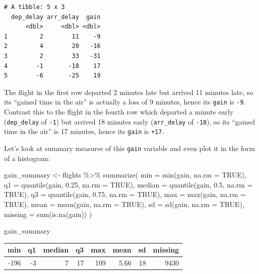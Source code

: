 \documentclass[
  letterpaper,
  DIV=11,
  numbers=noendperiod]{scrreprt}
\newenvironment{Shaded}{\begin{snugshade}}{\end{snugshade}}
\newcommand{\AttributeTok}[1]{\textcolor[rgb]{0.40,0.45,0.13}{#1}}
\newcommand{\ConstantTok}[1]{\textcolor[rgb]{0.56,0.35,0.01}{#1}}
\newcommand{\FloatTok}[1]{\textcolor[rgb]{0.68,0.00,0.00}{#1}}
\newcommand{\FunctionTok}[1]{\textcolor[rgb]{0.28,0.35,0.67}{#1}}
\newcommand{\NormalTok}[1]{\textcolor[rgb]{0.00,0.23,0.31}{#1}}
\newcommand{\OtherTok}[1]{\textcolor[rgb]{0.00,0.23,0.31}{#1}}
\newcommand{\SpecialCharTok}[1]{\textcolor[rgb]{0.37,0.37,0.37}{#1}}
\theoremstyle{definition}
\theoremstyle{remark}
\begin{document}
\begin{verbatim}
# A tibble: 5 x 3
  dep_delay arr_delay  gain
      <dbl>     <dbl> <dbl>
1         2        11    -9
2         4        20   -16
3         2        33   -31
4        -1       -18    17
5        -6       -25    19
\end{verbatim}

The flight in the first row departed 2 minutes late but arrived 11
minutes late, so its ``gained time in the air'' is actually a loss of 9
minutes, hence its \texttt{gain} is \texttt{-9}. Contrast this to the
flight in the fourth row which departed a minute early
(\texttt{dep\_delay} of \texttt{-1}) but arrived 18 minutes early
(\texttt{arr\_delay} of \texttt{-18}), so its ``gained time in the air''
is 17 minutes, hence its \texttt{gain} is \texttt{+17}.

Let's look at summary measures of this \texttt{gain} variable and even
plot it in the form of a histogram:

\begin{Shaded}
\begin{Highlighting}[]
\NormalTok{gain\_summary }\OtherTok{\textless{}{-}}\NormalTok{ flights }\SpecialCharTok{\%\textgreater{}\%} 
  \FunctionTok{summarize}\NormalTok{(}
    \AttributeTok{min =} \FunctionTok{min}\NormalTok{(gain, }\AttributeTok{na.rm =} \ConstantTok{TRUE}\NormalTok{),}
    \AttributeTok{q1 =} \FunctionTok{quantile}\NormalTok{(gain, }\FloatTok{0.25}\NormalTok{, }\AttributeTok{na.rm =} \ConstantTok{TRUE}\NormalTok{),}
    \AttributeTok{median =} \FunctionTok{quantile}\NormalTok{(gain, }\FloatTok{0.5}\NormalTok{, }\AttributeTok{na.rm =} \ConstantTok{TRUE}\NormalTok{),}
    \AttributeTok{q3 =} \FunctionTok{quantile}\NormalTok{(gain, }\FloatTok{0.75}\NormalTok{, }\AttributeTok{na.rm =} \ConstantTok{TRUE}\NormalTok{),}
    \AttributeTok{max =} \FunctionTok{max}\NormalTok{(gain, }\AttributeTok{na.rm =} \ConstantTok{TRUE}\NormalTok{),}
    \AttributeTok{mean =} \FunctionTok{mean}\NormalTok{(gain, }\AttributeTok{na.rm =} \ConstantTok{TRUE}\NormalTok{),}
    \AttributeTok{sd =} \FunctionTok{sd}\NormalTok{(gain, }\AttributeTok{na.rm =} \ConstantTok{TRUE}\NormalTok{),}
    \AttributeTok{missing =} \FunctionTok{sum}\NormalTok{(}\FunctionTok{is.na}\NormalTok{(gain))}
\NormalTok{  )}

\NormalTok{gain\_summary}
\end{Highlighting}
\end{Shaded}

\begin{longtable}[]{@{}rrrrrrrr@{}}
\toprule()
min & q1 & median & q3 & max & mean & sd & missing \\
\midrule()
\endhead
-196 & -3 & 7 & 17 & 109 & 5.66 & 18 & 9430 \\
\bottomrule()
\end{longtable}
\end{document}
